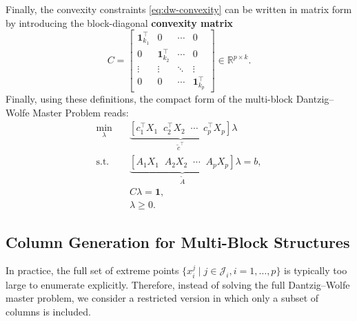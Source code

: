 \documentclass{book}
\theoremstyle{definition}
\numberwithin{algorithm_}{chapter}
\begin{document}
Finally, the convexity constraints \eqref{eq:dw-convexity}
can be written in matrix form by introducing the block-diagonal \textbf{convexity matrix}
\begin{equation}
C =
\begin{bmatrix}
\mathbf{1}^\top_{k_1} & 0 & \cdots & 0 \\
0 & \mathbf{1}^\top_{k_2} & \cdots & 0 \\
\vdots & \vdots & \ddots & \vdots \\
0 & 0 & \cdots & \mathbf{1}^\top_{k_p}
\end{bmatrix}
\in \mathbb{R}^{p \times k}.
\end{equation}
Finally, using these definitions, the compact form of the multi-block Dantzig--Wolfe Master Problem reads:
\begin{subequations}\label{eq:multiblock-dw-compact}
\begin{align}
\min_{\lambda} \quad & 
\underbrace{[c_1^\top X_1 \;\; c_2^\top X_2 \;\; \cdots \;\; c_p^\top X_p]}_{\tilde{c}^\top} \lambda \\
\text{s.t.} \quad & 
\underbrace{[A_1 X_1 \;\; A_2 X_2 \;\; \cdots \;\; A_p X_p]}_{\tilde{A}} \lambda = b, \\
& C \lambda = \mathbf{1}, \\[5pt]
& \lambda \ge 0.
\end{align}
\end{subequations}


\subsection{Column Generation for Multi-Block Structures}

In practice, the full set of extreme points $\{x_i^j \mid j \in \mathcal{J}_i, i=1,\dots,p\}$ is typically too large to enumerate explicitly. Therefore, instead of solving the full Dantzig--Wolfe master problem, we consider a restricted version in which only a subset of columns is included.

\bigskip
\end{document}
